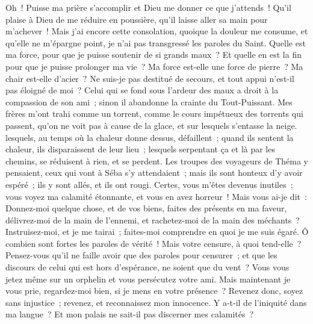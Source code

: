 \begin{multicols}{2}
Oh~! Puisse ma prière s'accomplir et Dieu me donner ce que j'attends~!
Qu'il plaise à Dieu de me réduire en poussière, qu'il laisse aller sa main pour m'achever~!
Mais j'ai encore cette consolation, quoique la douleur me consume, et qu'elle ne m'épargne point, je n'ai pas transgressé les paroles du Saint.
Quelle est ma force, pour que je puisse soutenir de si grands maux~? Et quelle en est la fin pour que je puisse prolonger ma vie~? 
Ma force est-elle une force de pierre~? Ma chair est-elle d'acier~?
Ne suis-je pas destitué de secours, et tout appui n'est-il pas éloigné de moi~?
Celui qui se fond sous l'ardeur des maux a droit à la compassion de son ami~; sinon il abandonne la crainte du Tout-Puissant.
Mes frères m'ont trahi comme un torrent, comme le cours impétueux des torrents qui passent,
qu'on ne voit pas à cause de la glace, et sur lesquels s'entasse la neige.
lesquels, au temps où la chaleur donne dessus, défaillent~; quand ils sentent la chaleur, ils disparaissent de leur lieu~;
lesquels serpentant ça et là par les chemins, se réduisent à rien, et se perdent.
Les troupes des voyageurs de Théma y pensaient, ceux qui vont à Séba s'y attendaient~;
mais ils sont honteux d'y avoir espéré~; ils y sont allés, et ils ont rougi.
Certes, vous m'êtes devenus inutiles~; vous voyez ma calamité étonnante, et vous en avez horreur~!
Mais vous ai-je dit~: Donnez-moi quelque chose, et de vos biens, faites des présents en ma faveur,
délivrez-moi de la main de l'ennemi, et rachetez-moi de la main des méchants~?
Instruisez-moi, et je me tairai~; faites-moi comprendre en quoi je me suis égaré.
Ô combien sont fortes les paroles de vérité~! Mais votre censure, à quoi tend-elle~?
Pensez-vous qu'il ne faille avoir que des paroles pour censurer~; et que les discours de celui qui est hors d'espérance, ne soient que du vent~?
Vous vous jetez même sur un orphelin et vous persécutez votre ami.
Mais maintenant je vous prie, regardez-moi bien, si je mens en votre présence~?
Revenez donc, soyez sans injustice~; revenez, et reconnaissez mon innocence.
Y a-t-il de l'iniquité dans ma langue~? Et mon palais ne sait-il pas discerner mes calamités~? 

\end{multicols}
